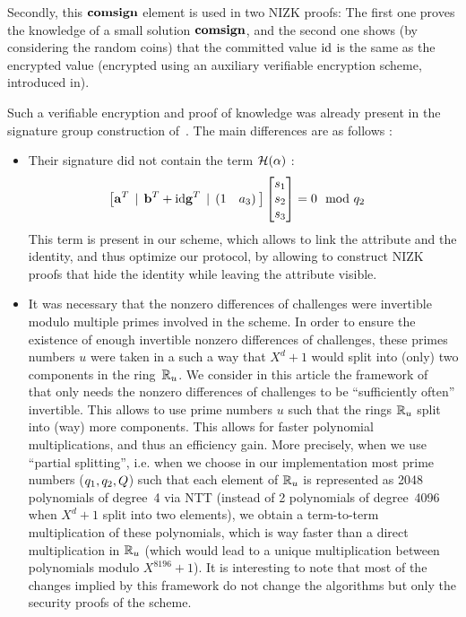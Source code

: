 Secondly, this $\mathbf{comsign}$ element is used in two NIZK proofs: The 
first one proves the knowledge of a small solution $\mathbf{comsign}$, and 
the second one shows (by considering the random coins) that the 
committed value $\text{id}$ is the same as the encrypted value 
(encrypted using an auxiliary verifiable encryption scheme, introduced 
in\cite{EC:LyuNev17}).


 Such a verifiable encryption and proof of knowledge was already present in the signature group
 construction of~\cite{CCS:delLyuSei18}. The main differences are as follows :
 \begin{itemize}
	 \item Their signature did not contain the term $\mathcal{H}(\alpha)$ :
\begin{align*}
&\big[\mathbf{a}^T \:\:|\:\: \mathbf{b}^T + \text{id} \mathbf{g}^T \:\:|\:\: (1 \quad a_3)\:\big] \begin{bmatrix} s_{1} \\ s_{2} \\ s_{3} \end{bmatrix} = 0 \mod {q_2}
\end{align*}
This term is present in our scheme, which allows to link the attribute and
the identity, and thus optimize our protocol, by allowing to construct NIZK 
proofs that hide the identity while leaving the attribute visible.


\item It was necessary that the nonzero differences of challenges were 
invertible modulo multiple
	primes involved in the scheme.
	In order to ensure the existence of enough invertible nonzero 
differences of challenges, 
these primes numbers $u$ were taken in a such a way that $X^d + 1$
	would split into (only) two components in the ring~$\mathbb{R}_u$. We consider 
in this article the framework of~\cite{C:AttLyuSei20} that only
        needs the nonzero differences of challenges to be ``sufficiently 
often'' invertible. This allows to use prime numbers $u$ such that the rings 
$\mathbb{R}_u$ split into (way) more components. This allows for faster polynomial 
multiplications, and thus an efficiency gain. More precisely, when we 
use ``partial splitting'', i.e. when we choose in our implementation 
most prime numbers ($q_1, q_2, Q$) such that each element of 
$\mathbb{R}_u$ is represented as 2048 polynomials of degree~4 via NTT (instead 
of 2 polynomials of degree~4096 when $X^d+1$ split into two elements), we obtain a term-to-term 
multiplication of these polynomials, which is way faster than a direct 
multiplication in $\mathbb{R}_u$ (which would lead to a unique multiplication 
between polynomials modulo $X^{8196} + 1$).
It is interesting to note
 that most of the changes implied by this framework do not change the 
algorithms but only the security proofs of the scheme.
 \end{itemize}

